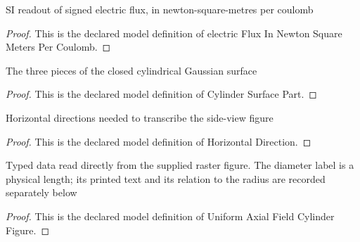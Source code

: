 \begin{definition}
  \label{def:physics:phyx-mini-0846:phyxminiproblems-problemphyxmini0846-electricfluxinnewtonsquaremeterspercoulomb}
  SI readout of signed electric flux, in newton-square-metres per coulomb
\end{definition}
\begin{proof}
  This is the declared model definition of electric Flux In Newton Square Meters Per Coulomb.
\end{proof}
\begin{definition}
  \label{def:physics:phyx-mini-0846:phyxminiproblems-problemphyxmini0846-cylindersurfacepart}
  The three pieces of the closed cylindrical Gaussian surface
\end{definition}
\begin{proof}
  This is the declared model definition of Cylinder Surface Part.
\end{proof}
\begin{definition}
  \label{def:physics:phyx-mini-0846:phyxminiproblems-problemphyxmini0846-horizontaldirection}
  Horizontal directions needed to transcribe the side-view figure
\end{definition}
\begin{proof}
  This is the declared model definition of Horizontal Direction.
\end{proof}
\begin{definition}
  \label{def:physics:phyx-mini-0846:phyxminiproblems-problemphyxmini0846-uniformaxialfieldcylinderfigure}
  Typed data read directly from the supplied raster figure. The diameter label is a physical length; its printed text and its relation to the radius are recorded separately below
\end{definition}
\begin{proof}
  This is the declared model definition of Uniform Axial Field Cylinder Figure.
\end{proof}
